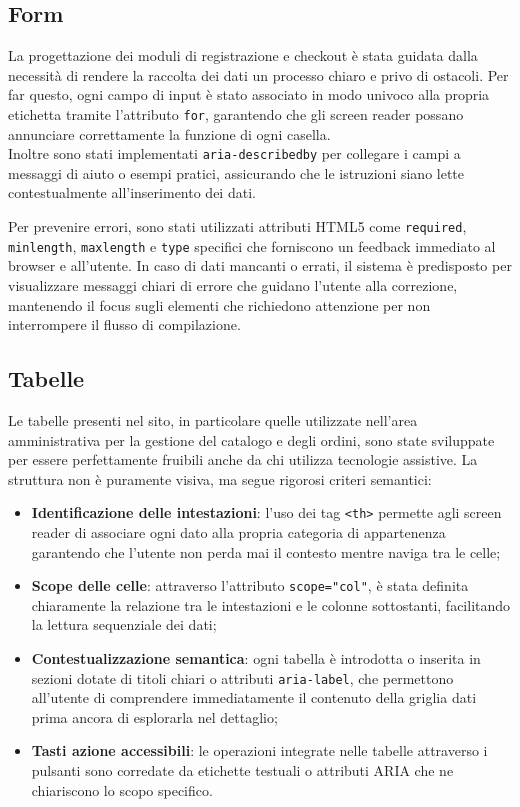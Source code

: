 \documentclass[11pt,a4paper]{article}
\begin{document}
\subsection{Form}
La progettazione dei moduli di registrazione e checkout \`e stata guidata dalla necessit\`a di rendere la raccolta dei dati un processo chiaro e privo di ostacoli. Per far questo, ogni campo di input \`e stato associato in modo univoco alla propria etichetta tramite l'attributo \texttt{for}, garantendo che gli screen reader possano annunciare correttamente la funzione di ogni casella.\\
Inoltre sono stati implementati \texttt{aria-describedby} per collegare i campi a messaggi di aiuto o esempi pratici, assicurando che le istruzioni siano lette contestualmente all'inserimento dei dati.

Per prevenire errori, sono stati utilizzati attributi HTML5 come \texttt{required}, \texttt{minlength}, \texttt{maxlength} e \texttt{type} specifici che forniscono un feedback immediato al browser e all'utente. In caso di dati mancanti o errati, il sistema \`e predisposto per visualizzare messaggi chiari di errore che guidano l'utente alla correzione, mantenendo il focus sugli elementi che richiedono attenzione per non interrompere il flusso di compilazione.

\subsection{Tabelle}
Le tabelle presenti nel sito, in particolare quelle utilizzate nell'area amministrativa per la gestione del catalogo e degli ordini, sono state sviluppate per essere perfettamente fruibili anche da chi utilizza tecnologie assistive. La struttura non \`e puramente visiva, ma segue rigorosi criteri semantici:

\begin{itemize}
  \item \textbf{Identificazione delle intestazioni}: l'uso dei tag \texttt{<th>} permette agli screen reader di associare ogni dato alla propria categoria di appartenenza garantendo che l'utente non perda mai il contesto mentre naviga tra le celle;
  \item \textbf{Scope delle celle}: attraverso l'attributo \texttt{scope="col"}, \`e stata definita chiaramente la relazione tra le intestazioni e le colonne sottostanti, facilitando la lettura sequenziale dei dati;
  \item \textbf{Contestualizzazione semantica}: ogni tabella \`e introdotta o inserita in sezioni dotate di titoli chiari o attributi \texttt{aria-label}, che permettono all'utente di comprendere immediatamente il contenuto della griglia dati prima ancora di esplorarla nel dettaglio;
  \item \textbf{Tasti azione accessibili}: le operazioni integrate nelle tabelle attraverso i pulsanti sono corredate da etichette testuali o attributi ARIA che ne chiariscono lo scopo specifico.
\end{itemize}
\end{document}

